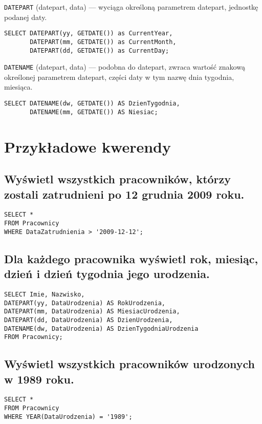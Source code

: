 \documentclass{article}
\begin{document}
{\tt DATEPART} (datepart, data) --- wyciąga określoną parametrem datepart, jednostkę podanej daty.
\begin{verbatim}
SELECT DATEPART(yy, GETDATE()) as CurrentYear,
       DATEPART(mm, GETDATE()) as CurrentMonth,
       DATEPART(dd, GETDATE()) as CurrentDay;
\end{verbatim}
{\tt DATENAME} (datepart, data) --- podobna do datepart, zwraca wartość znakową określonej parametrem datepart, części daty w tym nazwę dnia tygodnia, miesiąca.

\begin{verbatim}
SELECT DATENAME(dw, GETDATE()) AS DzienTygodnia,
       DATENAME(mm, GETDATE()) AS Niesiac;
\end{verbatim}

\section{Przykładowe kwerendy}

\subsection{Wyświetl wszystkich pracowników, którzy zostali zatrudnieni po 12 grudnia 2009 roku.}

\begin{verbatim}
SELECT *
FROM Pracownicy
WHERE DataZatrudnienia > '2009-12-12';
\end{verbatim}

\subsection{Dla każdego pracownika wyświetl rok, miesiąc, dzień i dzień tygodnia jego urodzenia.}

\begin{verbatim}
SELECT Imie, Nazwisko,
DATEPART(yy, DataUrodzenia) AS RokUrodzenia,
DATEPART(mm, DataUrodzenia) AS MiesiacUrodzenia,
DATEPART(dd, DataUrodzenia) AS DzienUrodzenia,
DATENAME(dw, DataUrodzenia) AS DzienTygodniaUrodzenia
FROM Pracownicy;
\end{verbatim}

\subsection{Wyświetl wszystkich pracowników urodzonych w 1989 roku.}
\begin{verbatim}
SELECT *
FROM Pracownicy
WHERE YEAR(DataUrodzenia) = '1989';
\end{verbatim}
\end{document}
